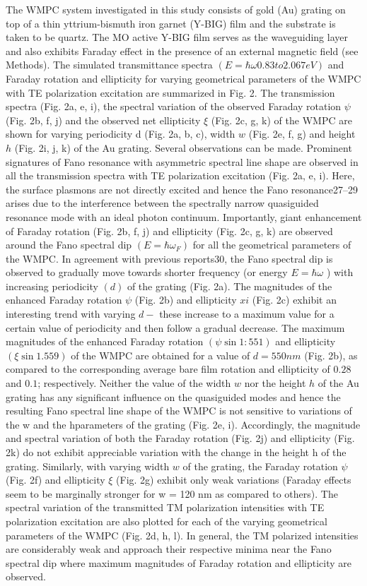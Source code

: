 \documentclass[13pt]{article}
\begin{document}
	The WMPC system investigated in this study consists of gold (Au) grating on top of a thin yttrium-bismuth iron garnet (Y-BIG) film and the substrate is taken to be quartz. The MO active Y-BIG film serves as the waveguiding layer and also exhibits Faraday effect in the presence of an external magnetic field (see Methods). The simulated transmittance spectra $(E = \hbar \omega 0.83 to 2.067 eV)$ and Faraday rotation and ellipticity for varying geometrical parameters of the WMPC with TE polarization excitation are summarized in Fig. 2. The transmission spectra (Fig. 2a, e, i), the spectral variation of the observed Faraday rotation $\psi$ (Fig. 2b, f, j) and the observed net ellipticity $\xi$ (Fig. 2c, g, k) of the WMPC are shown for varying periodicity d (Fig. 2a, b, c), width $w$ (Fig. 2e, f, g) and height $h$ (Fig. 2i, j, k) of the Au grating. Several observations can be made. Prominent signatures of Fano resonance with asymmetric spectral line shape are observed in all the transmission spectra with TE polarization excitation (Fig. 2a, e, i). Here, the surface plasmons are not directly excited and hence the Fano resonance27–29 arises due to the interference between the spectrally narrow quasiguided resonance mode with an ideal photon continuum. Importantly, giant enhancement of Faraday rotation (Fig. 2b, f, j) and ellipticity (Fig. 2c, g, k) are observed around the Fano spectral dip $(E = \hbar \omega_F )$ for all the geometrical parameters of the WMPC. In agreement with previous reports30, the Fano spectral dip is observed to gradually move towards shorter frequency (or energy $E = \hbar \omega$ ) with increasing periodicity $(d)$ of the grating (Fig. 2a). The magnitudes of the enhanced Faraday rotation $\psi$ (Fig. 2b) and ellipticity $xi$ (Fig. 2c) exhibit an interesting trend with varying $d-$ these increase to a maximum value for a certain value of periodicity and then follow a gradual decrease. The maximum magnitudes of the enhanced Faraday rotation $(\psi \sin 1:551)$ and ellipticity $(\xi \sin 1.559 )$ of the WMPC are obtained for a value of $d = 550 nm$ (Fig. 2b), as compared to the corresponding average bare film rotation and ellipticity of $0.28$ and $0.1$; respectively. Neither the value of the width $w$ nor the height $h$ of the Au grating has any significant influence on the quasiguided modes and hence the resulting Fano spectral line shape of the WMPC is not sensitive to variations of the w and the hparameters of the grating (Fig. 2e, i). Accordingly, the magnitude and spectral variation of both the Faraday rotation (Fig. 2j) and ellipticity (Fig. 2k) do not exhibit appreciable variation with the change in the height h of the grating. Similarly, with varying width $w$ of the grating, the Faraday rotation $\psi$ (Fig. 2f) and ellipticity $\xi$ (Fig. 2g) exhibit only weak variations (Faraday effects seem to be marginally stronger for w = 120 nm as compared to others). The spectral variation of the transmitted TM polarization intensities with TE polarization excitation are also plotted for each of the varying geometrical parameters of the WMPC (Fig. 2d, h, l). In general, the TM polarized intensities are considerably weak and approach their respective minima near the Fano spectral dip where maximum magnitudes of Faraday rotation and ellipticity are observed. 
\end{document}
